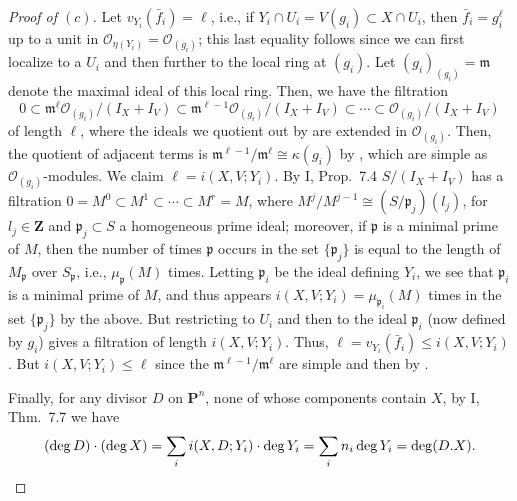 \documentclass[12pt,letterpaper]{article}
\theoremstyle{definition}
\theoremstyle{remark}
\numberwithin{equation}{section}
\numberwithin{figure}{problem}
\newcommand{\OO}{\mathcal{O}}
\begin{document}
\begin{proof}[Proof of $(c)$]
  Let $v_{Y_i}(\bar{f}_i) = \ell$, i.e., if $Y_i \cap U_i = V(g_i) \subset X \cap U_i$, then $\bar{f}_i = g_i^\ell$ up to a unit in $\OO_{\eta(Y_i)} = \OO_{(g_i)}$; this last equality follows since we can first localize to a $U_i$ and then further to the local ring at $(g_i)$. Let $(g_i)_{(g_i)} = \mathfrak{m}$ denote the maximal ideal of this local ring. Then, we have the filtration
  \begin{equation}\label{filtr}
    0 \subset \mathfrak{m}^\ell\OO_{(g_i)}/(I_X + I_V) \subset \mathfrak{m}^{\ell-1}\OO_{(g_i)}/(I_X + I_V) \subset \cdots \subset \OO_{(g_i)}/(I_X + I_V)
  \end{equation}
  of length $\ell$, where the ideals we quotient out by are extended in $\OO_{(g_i)}$. Then, the quotient of adjacent terms is $\mathfrak{m}^{\ell-1}/\mathfrak{m}^\ell \cong \kappa(g_i)$ by \cite[Prop.~$2.1i$]{AM69}, which are simple as $\OO_{(g_i)}$-modules. We claim $\ell = i(X,V;Y_i)$. By I, Prop.~7.4 $S/(I_X + I_V)$ has a filtration $0 = M^0 \subset M^1 \subset \cdots \subset M^r = M$, where $M^j/M^{j-1} \cong (S/\mathfrak{p}_j)(l_j)$, for $l_j \in \mathbf{Z}$ and $\mathfrak{p}_j \subset S$ a homogeneous prime ideal; moreover, if $\mathfrak{p}$ is a minimal prime of $M$, then the number of times $\mathfrak{p}$ occurs in the set $\{\mathfrak{p}_j\}$ is equal to the length of $M_\mathfrak{p}$ over $S_\mathfrak{p}$, i.e., $\mu_{\mathfrak{p}}(M)$ times. Letting $\mathfrak{p}_i$ be the ideal defining $Y_i$, we see that $\mathfrak{p}_i$ is a minimal prime of $M$, and thus appears $i(X,V;Y_i) = \mu_{\mathfrak{p}_i}(M)$ times in the set $\{\mathfrak{p}_j\}$ by the above. But restricting to $U_i$ and then to the ideal $\mathfrak{p}_i$ (now defined by $g_i$) gives a filtration of length $i(X,V;Y_i)$. Thus, $\ell = v_{Y_i}(\bar{f}_i) \le i(X,V;Y_i)$. But $i(X,V;Y_i) \le \ell$ since the $\mathfrak{m}^{\ell-1}/\mathfrak{m}^\ell$ are simple and then by \cite[Prop.~6.7]{AM69}.
  \par Finally, for any divisor $D$ on $\mathbf{P}^n$, none of whose components contain $X$, by I, Thm.~7.7 we have
  \begin{equation*}
    (\deg D) \cdot (\deg X) = \sum_i i(X,D;Y_i) \cdot \deg Y_i = \sum_i n_i \deg Y_i = \deg(D.X).\qedhere
  \end{equation*}
\end{proof}
\end{document}
